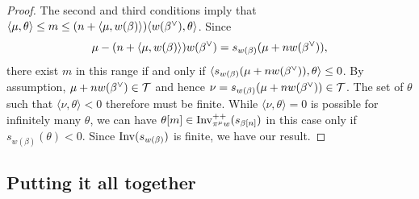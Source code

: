 \documentclass[10pt]{amsart}
\begin{document}
\begin{proof}
The second and third conditions imply that $\langle \mu, \theta \rangle \leq m \leq (n + \langle \mu, w(\beta) \rangle) \langle w(\beta^\vee), \theta \rangle$. Since
\begin{equation*}
\mu - (n + \langle \mu, w(\beta) \rangle) w(\beta^\vee) = s_{w(\beta)}(\mu + n w(\beta^\vee)),
\end{equation*}
there exist $m$ in this range if and only if $\langle s_{w(\beta)}(\mu + n w(\beta^\vee)), \theta \rangle \le 0$. By assumption, $\mu + n w(\beta^\vee) \in \mathcal{T}$ and hence $\nu = s_{w(\beta)}(\mu + n w(\beta^\vee)) \in \mathcal{T}$. The set of $\theta$ such that $\langle \nu, \theta \rangle < 0$ therefore must be finite. While $\langle \nu, \theta \rangle = 0$ is possible for infinitely many $\theta$, we can have $\theta[m] \in \operatorname{Inv}^{++}_{\pi^\mu w}(s_{\beta[n]})$ in this case only if $s_{w(\beta)}(\theta)<0$. Since $\operatorname{Inv}(s_{w(\beta)})$ is finite, we have our result.
\end{proof}

\subsection{Putting it all together}
\end{document}
